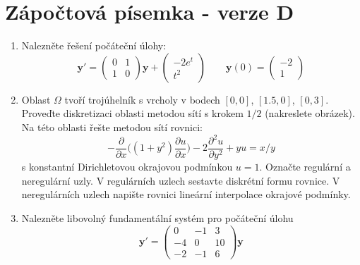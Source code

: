 \documentclass[a4paper,10pt]{article}
\def\vc#1{\mathbf{\boldsymbol{#1}}}     %
\def\prtl{\partial}                                        %
\begin{document}
\section*{Zápočtová písemka - verze D}
\begin{enumerate}
 \item 
   Nalezněte řešení počáteční úlohy:
   \[
    \vc y'=\begin{pmatrix}
          0 & 1 \\ 1 & 0
       \end{pmatrix} \vc y
       +
       \begin{pmatrix}
         -2 e^t \\  t^2
       \end{pmatrix}
    \qquad
    \vc y(0)=\begin{pmatrix}
           -2 \\ 1
         \end{pmatrix}
   \]
 \item 
   Oblast $\Omega$ tvoří trojúhelník s vrcholy v bodech $[0,0]$, $[1.5, 0]$, $[0,3]$. Proveďte diskretizaci 
   oblasti metodou sítí s krokem $1/2$ (nakreslete obrázek). Na této oblasti řešte metodou sítí rovnici:
   \[
      -\frac{\prtl}{\prtl x}\big( (1+y^2)\frac{\prtl u}{\prtl x}\big) - 2 \frac{\prtl^2 u}{\prtl y^2} + yu= x/y
   \]
   s konstantní Dirichletovou okrajovou podmínkou $u = 1$.
   Označte regulární a neregulární uzly. V regulárních uzlech sestavte diskrétní formu rovnice. V neregulárních 
   uzlech napište rovnici lineární interpolace okrajové podmínky.
      
 \item
    Nalezněte libovolný fundamentální systém pro počáteční úlohu
    \[
    \vc y'=\begin{pmatrix}
          0 & -1 & 3 \\ 
          -4 & 0 & 10 \\
          -2 & -1 & 6
       \end{pmatrix} \vc y   
    \]
\end{enumerate}

\pagebreak
\end{document}
